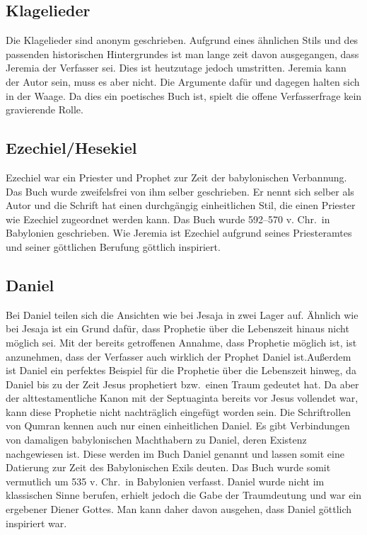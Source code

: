 \subsection*{Klagelieder}
Die Klagelieder sind anonym geschrieben. Aufgrund eines ähnlichen Stils und des passenden historischen Hintergrundes ist man lange zeit davon ausgegangen, dass Jeremia der Verfasser sei. Dies ist heutzutage jedoch umstritten. Jeremia kann der Autor sein, muss es aber nicht. Die Argumente dafür und dagegen halten sich in der Waage. Da dies ein poetisches Buch ist, spielt die offene Verfasserfrage kein gravierende Rolle.

\subsection*{Ezechiel/Hesekiel}
Ezechiel war ein Priester und Prophet zur Zeit der babylonischen Verbannung. Das Buch wurde zweifelsfrei von ihm selber geschrieben. Er nennt sich selber als Autor und die Schrift hat einen durchgängig einheitlichen Stil, die einen Priester wie Ezechiel zugeordnet werden kann. Das Buch wurde 592--570 v. Chr.\ in Babylonien geschrieben. Wie Jeremia ist Ezechiel aufgrund seines Priesteramtes und seiner göttlichen Berufung göttlich inspiriert.

\subsection*{Daniel}
Bei Daniel teilen sich die Ansichten wie bei Jesaja in zwei Lager auf. Ähnlich wie bei Jesaja ist ein Grund dafür, dass Prophetie über die Lebenszeit hinaus nicht möglich sei. Mit der bereits getroffenen Annahme, dass Prophetie möglich ist, ist anzunehmen, dass der Verfasser auch wirklich der Prophet Daniel ist.Außerdem ist Daniel ein perfektes Beispiel für die Prophetie über die Lebenszeit hinweg, da Daniel bis zu der Zeit Jesus prophetiert bzw.\ einen Traum gedeutet hat. Da aber der alttestamentliche Kanon mit der Septuaginta bereits vor Jesus vollendet war, kann diese Prophetie nicht nachträglich eingefügt worden sein. Die Schriftrollen von Qumran kennen auch nur einen einheitlichen Daniel.  Es gibt Verbindungen von damaligen babylonischen Machthabern zu Daniel, deren Existenz nachgewiesen ist. Diese werden im Buch Daniel  genannt und lassen somit eine Datierung zur Zeit des Babylonischen Exils deuten. Das Buch wurde somit vermutlich um 535 v. Chr.\ in Babylonien verfasst. Daniel wurde nicht im klassischen Sinne berufen, erhielt jedoch die Gabe der Traumdeutung und war ein ergebener Diener Gottes. Man kann daher davon ausgehen, dass Daniel göttlich inspiriert war.

